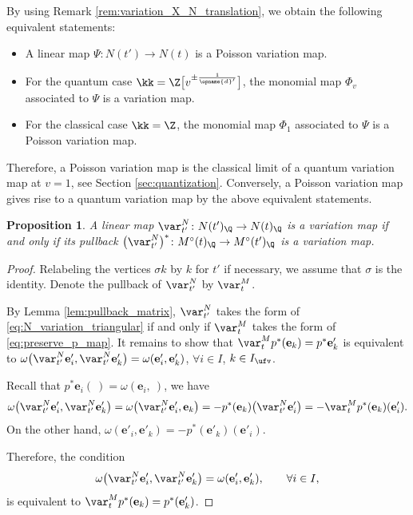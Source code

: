 \documentclass[pdftex]{sigma}
\newcommand{\Mc}{M^\circ}
\newcommand{\Iufv}{I_{\ufv}}
\renewcommand{\diag}{\opname{d}'}
\newcommand{\ee}{\mathbf{e}}
\numberwithin{equation}{section}
\newtheorem{Proposition}[Theorem]{Proposition}
 { \theoremstyle{definition}
\newtheorem{Definition}[Theorem]{Definition}
\newtheorem{Note}[Theorem]{Note}
\newtheorem{Example}[Theorem]{Example}
\newtheorem{Remark}[Theorem]{Remark}
\newtheorem{Assumption}[Theorem]{Assumption}
}
\begin{document}
\begin{Remark}\label{rem:X-Poisson_quantum_variation}
By using Remark \ref{rem:variation_X_N_translation}, we obtain the following equivalent statements:
\begin{itemize}\itemsep=0pt
 \item A linear map $\varPsi\colon N(t')\rightarrow N(t)$ is a Poisson variation map.
 \item For the quantum case $\kk=\Z\big[v^{\pm\frac{1}{\diag}}\big]$, the monomial map $\varPhi_v$ associated to $\varPsi$ is a variation map.
 \item For the classical case $\kk=\Z$, the monomial map $\varPhi_1$ associated to $\varPsi$ is a Poisson variation map.
\end{itemize}
Therefore, a Poisson variation map is the classical limit of a quantum variation map at $v=1$, see Section \ref{sec:quantization}. Conversely, a Poisson variation map gives rise to a quantum variation map by the above equivalent statements.
\end{Remark}

\begin{Proposition}\label{prop:linear_N_variation}
A linear map $\var_{t'}^{N}\colon N(t')_{\Q}\rightarrow N(t)_{\Q}$ is a
variation map if and only if its pullback $\bigl(\var_{t'}^{N}\bigr)^{*}\colon\Mc(t)_{\Q}\rightarrow\Mc(t')_{\Q}$
is a variation map.
\end{Proposition}

\begin{proof}
Relabeling the vertices $\sigma k$ by $k$ for $t'$ if necessary,
we assume that $\sigma$ is the identity. Denote the pullback of $\var_{t'}^{N}$
by $\var_{t}^{M}$.

By Lemma \ref{lem:pullback_matrix}, $\var_{t'}^{N}$ takes the form
of \eqref{eq:N_variation_triangular} if and only if $\var_{t}^{M}$
takes the form of \eqref{eq:preserve_p_map}. It remains
to show that $\var_{t}^{M}p^{*}(\ee_{k})=p^{*}\ee_{k}'$ is equivalent
to $\omega\bigl(\var_{t'}^{N}\ee'_{i},\var_{t'}^{N}\ee'_{k}\bigr)=\omega(\ee'_{i},\ee'_{k})$, $\forall i\in I$, $k\in\Iufv$.

Recall that $p^{*}\ee_{i}(\ )=\omega(\ee_{i},\ )$, we
have
\begin{align*}
\omega\bigl(\var_{t'}^{N}\ee'_{i},\var_{t'}^{N}\ee'_{k}\bigr) =\omega\bigl(\var_{t'}^{N}\ee'_{i},\ee_{k}\bigr) =-p^{*}(\ee_{k})\bigl(\var_{t'}^{N}\ee'_{i}\bigr) =-\var_{t}^{M}p^{*}(\ee_{k})(\ee_{i}').
\end{align*}
On the other hand, $\omega(\ee'_{i},\ee'_{k})=-p^{*}(\ee'_{k})(\ee'_{i})$.

Therefore, the condition \[\omega\bigl(\var_{t'}^{N}\ee'_{i},\var_{t'}^{N}\ee'_{k}\bigr)=\omega(\ee'_{i},\ee'_{k}),\qquad\forall i\in I,\]
 is equivalent to $\var_{t}^{M}p^{*}(\ee_{k})=p^{*}(\ee'_{k})$.
\end{proof}
\end{document}
